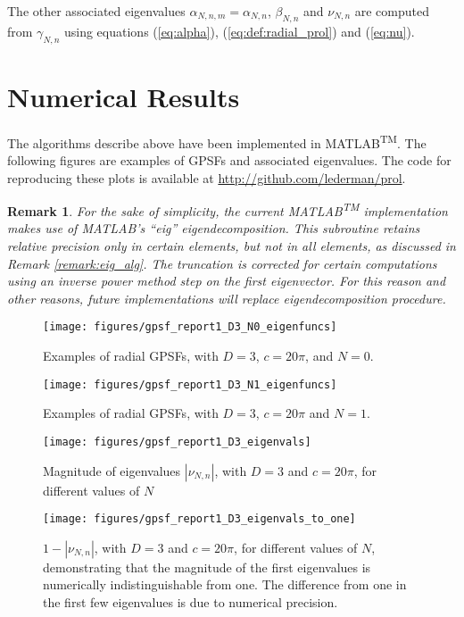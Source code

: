 \documentclass[12pt]{article}
\newtheorem{remark}{Remark}
\begin{document}
The other associated eigenvalues  $\alpha_{N,n,m} = \alpha_{N,n}$, $\beta_{N,n}$ and 
$\nu_{N,n}$ are computed from $\gamma_{N,n}$ using equations (\ref{eq:alpha}), (\ref{eq:def:radial_prol}) and (\ref{eq:nu}).


\section{Numerical Results}\label{sec:results}

The algorithms describe above have been implemented in MATLAB\textsuperscript{TM}.
The following figures are examples of GPSFs and associated eigenvalues. 
The code for reproducing these plots is available at \url{http://github.com/lederman/prol}.

\begin{remark}
For the sake of simplicity, the current MATLAB\textsuperscript{TM} implementation makes use of MATLAB's ``eig'' eigendecomposition.
This subroutine retains relative precision only in certain elements, but not in all elements, as discussed in Remark \ref{remark:eig_alg}.
The truncation is corrected for certain computations using an inverse power method step on the first eigenvector. 
For this reason and other reasons, future implementations will replace eigendecomposition procedure. 
\end{remark}


\begin{figure}[h]
\texttt{[image: figures/gpsf\_report1\_D3\_N0\_eigenfuncs]}
\caption{Examples of radial GPSFs, with $D=3$, $c=20\pi$, and $N=0$.  }
\end{figure}


\begin{figure}[h]
\texttt{[image: figures/gpsf\_report1\_D3\_N1\_eigenfuncs]}
\caption{Examples of radial GPSFs, with $D=3$, $c=20\pi$ and $N=1$.  }
\end{figure}


\begin{figure}[h]
\texttt{[image: figures/gpsf\_report1\_D3\_eigenvals]}
\caption{Magnitude of eigenvalues $|\nu_{N,n}|$, with $D=3$ and $c=20\pi$, for different values of $N$  }
\end{figure}

\begin{figure}[h]
\texttt{[image: figures/gpsf\_report1\_D3\_eigenvals\_to\_one]}
\caption{$1-|\nu_{N,n}|$, with $D=3$ and $c=20\pi$, for different values of $N$, demonstrating that the magnitude of the first eigenvalues is numerically indistinguishable from one. The difference from one in the first few eigenvalues is due to numerical precision.  }
\end{figure}
\end{document}
